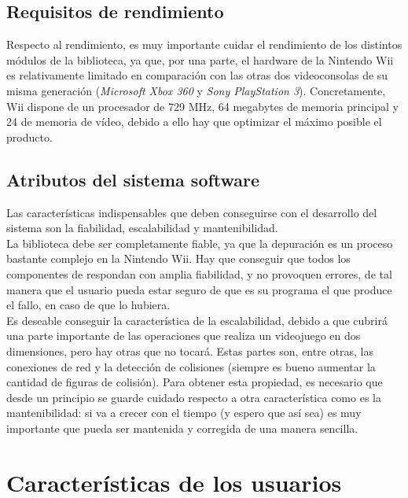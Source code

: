 \subsection{Requisitos de rendimiento}

Respecto al rendimiento, es muy importante cuidar el rendimiento de los distintos módulos de la biblioteca, ya que, por una parte, el hardware de la Nintendo Wii es relativamente limitado en comparación con las otras dos videoconsolas de su misma generación (\emph{Microsoft Xbox 360} y \emph{Sony PlayStation 3}). Concretamente, Wii dispone de un procesador de 729 MHz, 64 megabytes de memoria principal y 24 de memoria de vídeo, debido a ello hay que optimizar el máximo posible el producto.

\subsection{Atributos del sistema software}

Las características indispensables que deben conseguirse con el desarrollo del sistema son la fiabilidad, escalabilidad y mantenibilidad.\\

La biblioteca debe ser completamente fiable, ya que la depuración es un proceso bastante complejo en la Nintendo Wii. Hay que conseguir que todos los componentes de  respondan con amplia fiabilidad, y no provoquen errores, de tal manera que el usuario pueda estar seguro de que es su programa el que produce el fallo, en caso de que lo hubiera.\\

Es deseable conseguir la característica de la escalabilidad, debido a que  cubrirá una parte importante de las operaciones que realiza un videojuego en dos dimensiones, pero hay otras que no tocará. Estas partes son, entre otras, las conexiones de red y la detección de colisiones (siempre es bueno aumentar la cantidad de figuras de colisión). Para obtener esta propiedad, es necesario que desde un principio se guarde cuidado respecto a otra característica como es la mantenibilidad: si  va a crecer con el tiempo (y espero que así sea) es muy importante que pueda ser mantenida y corregida de una manera sencilla.

\section{Características de los usuarios}

